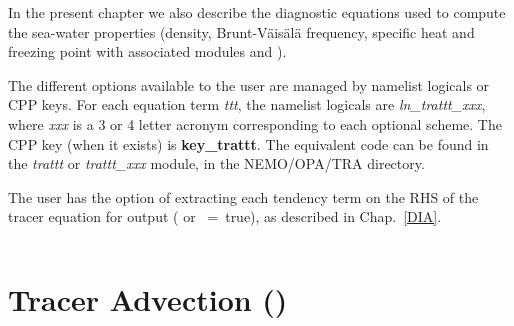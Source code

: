\documentclass[NEMO_book]{subfiles}
\begin{document}
In the present chapter we also describe the diagnostic equations used to compute 
the sea-water properties (density, Brunt-V\"{a}is\"{a}l\"{a} frequency, specific heat and 
freezing point with associated modules  and ).

The different options available to the user are managed by namelist logicals or 
CPP keys. For each equation term \textit{ttt}, the namelist logicals are \textit{ln\_trattt\_xxx}, 
where \textit{xxx} is a 3 or 4 letter acronym corresponding to each optional scheme. 
The CPP key (when it exists) is \textbf{key\_trattt}. The equivalent code can be 
found in the \textit{trattt} or \textit{trattt\_xxx} module, in the NEMO/OPA/TRA directory.

The user has the option of extracting each tendency term on the RHS of the tracer 
equation for output ( or ~=~true), as described in Chap.~\ref{DIA}.

$\ $\newline    %
\section  [Tracer Advection (\textit{traadv})]
		{Tracer Advection ()}
\label{TRA_adv}
\end{document}
